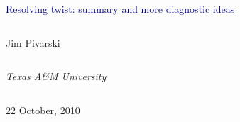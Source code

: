 \documentclass[compress]{beamer}
\begin{document}
\begin{frame}
\vfill
\begin{center}
\textcolor{darkblue}{\Large Resolving twist: summary and more diagnostic ideas}

\vfill
\begin{columns}
\begin{center}
\large
Jim Pivarski
\end{center}
\end{columns}

\begin{columns}
\begin{center}
\scriptsize
{\it Texas A\&M University}
\end{center}
\end{columns}

\vfill
22 October, 2010

\end{center}
\end{frame}


\small
\end{document}

